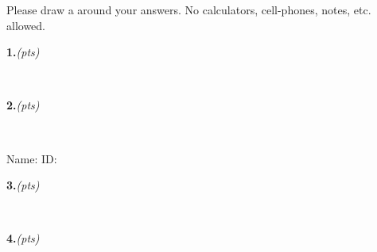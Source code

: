 \documentclass[12pt,a4paper]{article}
\begin{document}
\vspace{.5cm}
Please draw a  around your answers. 
No calculators, cell-phones, notes, etc. allowed.

\vspace{.7cm}



% 
%
% 
%
%
%

% 
% 
%
% 
%  
% 
\noindent\textbf{1.}\textit{(pts)} 







\newpage
{\ }\vspace{-4cm}


%
% 
%
% 
%
\noindent\textbf{2.}\textit{(pts)} 








\newpage
{\ }\vspace{-4cm}

\qquad Name:  \hfill ID: \hfill \

\hrulefill

\vspace{1cm}

%  
% 
%
% 
%  
\noindent\textbf{3.}\textit{(pts)} 









\newpage
{\ }\vspace{-4cm}

%  
%  
%  
%
%
\noindent\textbf{4.}\textit{(pts)} 
\end{document}
